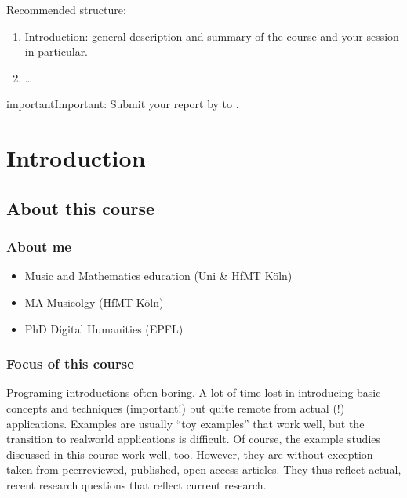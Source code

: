 \documentclass[letterpaper,10pt,english]{sphinxmanual}
\begin{document}
Recommended structure:
\begin{enumerate}
%
\item {} 
Introduction: general description and summary of the course and your session in particular.

\item {} 
…

\end{enumerate}

\begin{sphinxadmonition}{important}{Important:}
Submit your report by  to .
\end{sphinxadmonition}


\chapter{Introduction}
\label{\detokenize{2_introduction:introduction}}\label{\detokenize{2_introduction::doc}}

\section{About this course}
\label{\detokenize{2_introduction:about-this-course}}

\subsection{About me}
\label{\detokenize{2_introduction:about-me}}\begin{itemize}
\item {} 
Music and Mathematics education (Uni \& HfMT Köln)

\item {} 
MA Musicolgy (HfMT Köln)

\item {} 
PhD Digital Humanities (EPFL)

\end{itemize}


\subsection{Focus of this course}
\label{\detokenize{2_introduction:focus-of-this-course}}
Programing introductions often boring.
A lot of time lost in introducing basic concepts and techniques (important!)
but quite remote from actual (!) applications. Examples are usually “toy examples”
that work well, but the transition to real\sphinxhyphen{}world applications is difficult.
Of course, the example studies discussed in this course work well, too.
However, they are without exception taken from peer\sphinxhyphen{}reviewed, published, open access articles.
They thus reflect actual, recent research questions that reflect current research.
\end{document}
